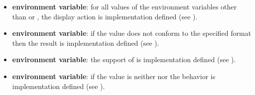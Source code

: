 \begin{itemize}
\item {} \textbf{environment variable}: for all values of the environment variables other than  or , the display action is implementation defined (see
).

\item {} \textbf{environment variable}: if the value does not
conform to the specified format then the result is implementation defined (see
).

\item {} \textbf{environment variable}: the support of  is implementation defined (see
).

\item {} \textbf{environment variable}: if the value is neither
 nor  the behavior is implementation defined (see
).

\end{itemize}



